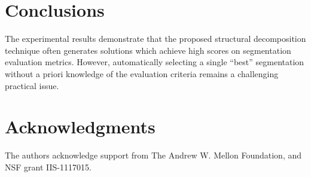 \documentclass{article}
\begin{document}
\section{Conclusions}
The experimental results demonstrate that the proposed structural decomposition 
technique often generates solutions which achieve high scores on segmentation 
evaluation metrics.  However, automatically selecting a single ``best'' segmentation 
without a priori knowledge of the evaluation criteria remains a challenging practical 
issue.

\section{Acknowledgments}
The authors acknowledge support from The Andrew W. Mellon Foundation,
and NSF grant IIS-1117015.


\end{document}
